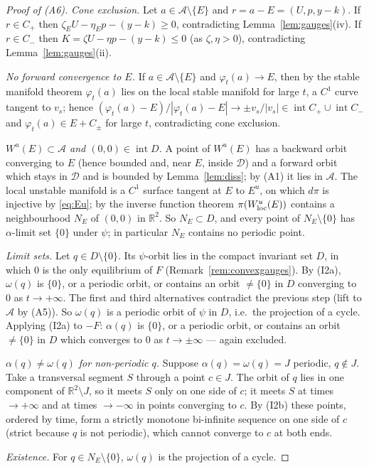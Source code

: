 \documentclass[11pt,a4paper]{article}
\numberwithin{equation}{section}
\theoremstyle{remark}\newtheorem{remark}[theorem]{Remark}
\newcommand{\R}{\mathbb R}
\newcommand{\cA}{\mathcal A}
\newcommand{\cD}{\mathcal D}
\DeclareMathOperator{\inter}{int}
\begin{document}
\begin{proof}[Proof of (A6)]
\emph{Cone exclusion.} Let $a\in\cA\setminus\{E\}$ and $r=a-E=(U,p,y-k)$. If $r\in C_+$ then
$\zeta_EU-\eta_Ep-(y-k)\ge0$, contradicting Lemma~\ref{lem:gauges}(iv). If $r\in C_-$ then
$K=\zeta U-\eta p-(y-k)\le0$ (as $\zeta,\eta>0$), contradicting Lemma~\ref{lem:gauges}(ii).

\emph{No forward convergence to $E$.} If $a\in\cA\setminus\{E\}$ and $\varphi_t(a)\to E$, then by the stable manifold
theorem $\varphi_t(a)$ lies on the local stable manifold for large $t$, a $C^1$ curve tangent to $v_s$; hence
$(\varphi_t(a)-E)/|\varphi_t(a)-E|\to\pm v_s/|v_s|\in\inter C_+\cup\inter C_-$ and $\varphi_t(a)\in E+C_\pm$ for
large $t$, contradicting cone exclusion.

\emph{$W^u(E)\subset\cA$ and $(0,0)\in\inter D$.} A point of $W^u(E)$ has a backward orbit converging to $E$ (hence
bounded and, near $E$, inside $\cD$) and a forward orbit which stays in $\cD$ and is bounded by
Lemma~\ref{lem:diss}; by (A1) it lies in $\cA$. The local unstable manifold is a $C^1$ surface tangent at $E$ to
$E^u$, on which $d\pi$ is injective by \eqref{eq:Eu}; by the inverse function theorem $\pi(W^u_{\rm loc}(E))$
contains a neighbourhood $N_E$ of $(0,0)$ in $\R^2$. So $N_E\subset D$, and every point of $N_E\setminus\{0\}$ has
$\alpha$-limit set $\{0\}$ under $\psi$; in particular $N_E$ contains no periodic point.

\emph{Limit sets.} Let $q\in D\setminus\{0\}$. Its $\psi$-orbit lies in the compact invariant set $D$, in which $0$
is the only equilibrium of $F$ (Remark~\ref{rem:convexgauges}). By (I2a), $\omega(q)$ is $\{0\}$, or a periodic
orbit, or contains an orbit $\ne\{0\}$ in $D$ converging to $0$ as $t\to+\infty$. The first and third alternatives
contradict the previous step (lift to $\cA$ by (A5)). So $\omega(q)$ is a periodic orbit of $\psi$ in $D$, i.e.\ the
projection of a cycle. Applying (I2a) to $-F$: $\alpha(q)$ is $\{0\}$, or a periodic orbit, or contains an orbit
$\ne\{0\}$ in $D$ which converges to $0$ as $t\to\pm\infty$ --- again excluded.

\emph{$\alpha(q)\neq\omega(q)$ for non-periodic $q$.} Suppose $\alpha(q)=\omega(q)=J$ periodic, $q\notin J$. Take a
transversal segment $S$ through a point $c\in J$. The orbit of $q$ lies in one component of $\R^2\setminus J$, so
it meets $S$ only on one side of $c$; it meets $S$ at times $\to+\infty$ and at times $\to-\infty$ in points
converging to $c$. By (I2b) these points, ordered by time, form a strictly monotone bi-infinite sequence on one
side of $c$ (strict because $q$ is not periodic), which cannot converge to $c$ at both ends.

\emph{Existence.} For $q\in N_E\setminus\{0\}$, $\omega(q)$ is the projection of a cycle.
\end{proof}
\end{document}
